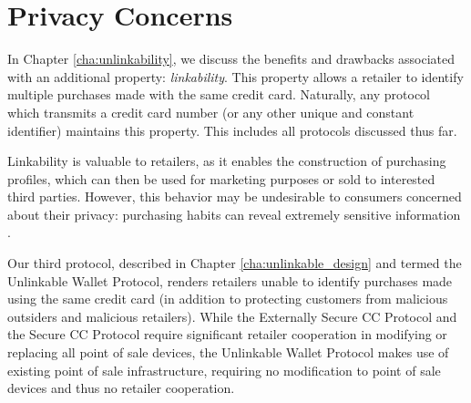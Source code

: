 \section{Privacy Concerns}
\label{sec:intro-privacy}

In Chapter \ref{cha:unlinkability}, we discuss the benefits and drawbacks associated with an additional property: \emph{linkability}.
This property allows a retailer to identify multiple purchases made with the same credit card.
Naturally, any protocol which transmits a credit card number (or any other unique and constant identifier) maintains this property.
This includes all protocols discussed thus far.

Linkability is valuable to retailers, as it enables the construction of purchasing profiles,
    which can then be used for marketing purposes or sold to interested third parties.
However, this behavior may be undesirable to consumers concerned about their privacy:
    purchasing habits can reveal extremely sensitive information \cite{targetpregnant}.

Our third protocol, described in Chapter \ref{cha:unlinkable_design} and termed the Unlinkable Wallet Protocol,
    renders retailers unable to identify purchases made using the same credit card (in addition to protecting customers from malicious outsiders and malicious retailers).
While the Externally Secure CC Protocol and the Secure CC Protocol require significant retailer cooperation in modifying or replacing all point of sale devices,
    the Unlinkable Wallet Protocol makes use of existing point of sale infrastructure,
    requiring no modification to point of sale devices and thus no retailer cooperation.
